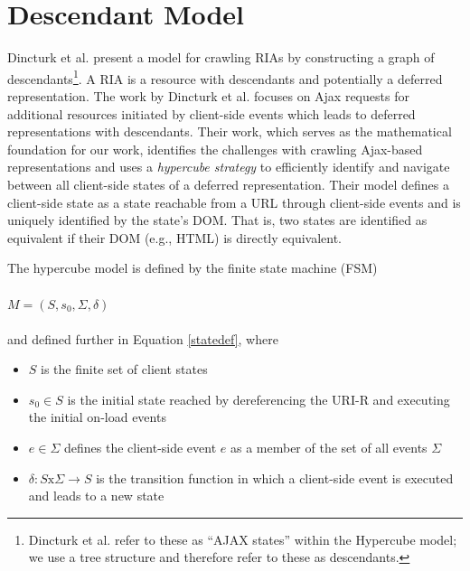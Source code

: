 \documentclass{sig-alternate}
\begin{document}
\section{Descendant Model}
Dincturk et al. \cite{dincturkAjax} present a model for crawling RIAs by constructing a graph of descendants\footnote{Dincturk et al. refer to these as ``AJAX states'' within the Hypercube model; we use a tree structure and therefore refer to these as descendants.}. A RIA is a resource with descendants and potentially a deferred representation. The work by Dincturk et al. focuses on Ajax requests for additional resources initiated by client-side events which leads to deferred representations with descendants. Their work, which serves as the mathematical foundation for our work, identifies the challenges with crawling Ajax-based representations and uses a \emph{hypercube strategy} to efficiently identify and navigate between all client-side states of a deferred representation. Their model defines a client-side state as a state reachable from a URL through client-side events and is uniquely identified by the state's DOM. That is, two states are identified as equivalent if their DOM (e.g., HTML) is directly equivalent.

The hypercube model is defined by the finite state machine (FSM) 
\\\\
\noindent$M = (S, s_0, \Sigma, \delta)$ 
\\\\
\noindent and defined further in Equation \ref{statedef}, where

\begin{itemize}
\item $S$ is the finite set of client states
\item $s_0 \in S$ is the initial state reached by dereferencing the URI-R and executing the initial on-load events
\item $e \in \Sigma$ defines the client-side event $e$ as a member of the set of all events $\Sigma$
\item $\delta : S \text{x} \Sigma \rightarrow S$ is the transition function in which a client-side event is executed and leads to a new state
\end{itemize}
\end{document}
